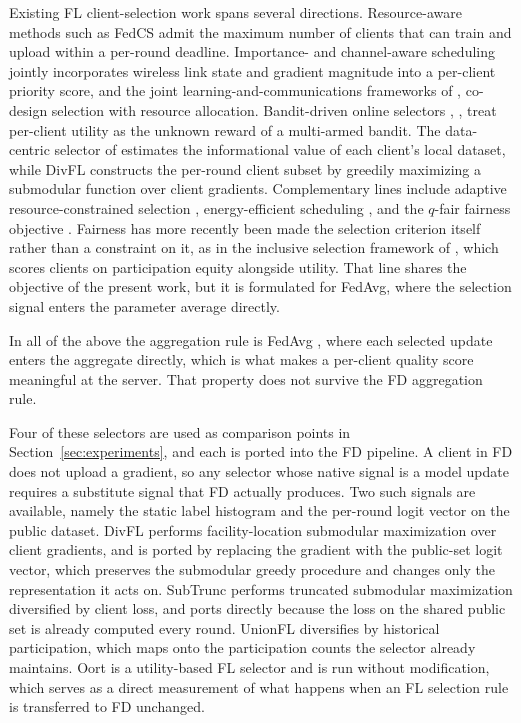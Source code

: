 \documentclass[journal]{IEEEtran}
\newcommand{\rev}[1]{#1}
\begin{document}
Existing FL client-selection work spans several directions. Resource-aware methods such as FedCS \cite{nishio2019client} admit the maximum number of clients that can train and upload within a per-round deadline. Importance- and channel-aware scheduling \cite{yang2020scheduling, ren2020scheduling, shi2020joint} jointly incorporates wireless link state and gradient magnitude into a per-client priority score, and the joint learning-and-communications frameworks of \cite{chen2021joint}, \cite{chen2021convergence} co-design selection with resource allocation. Bandit-driven online selectors \cite{xia2020mab}, \cite{cho2020bandit}, \cite{xu2021online} treat per-client utility as the unknown reward of a multi-armed bandit. The data-centric selector of \cite{saha2023datacentric} estimates the informational value of each client's local dataset, while DivFL \cite{balakrishnan2022divfl} constructs the per-round client subset by greedily maximizing a submodular function over client gradients. Complementary lines include adaptive resource-constrained selection \cite{wang2019adaptive}, energy-efficient scheduling \cite{yang2021energy}, and the $q$-fair fairness objective \cite{li2020qffl}. \rev{Fairness has more recently been made the selection criterion itself rather than a constraint on it, as in the inclusive selection framework of \cite{arisdakessian2026vox}, which scores clients on participation equity alongside utility. That line shares the objective of the present work, but it is formulated for FedAvg, where the selection signal enters the parameter average directly.}

In all of the above the aggregation rule is FedAvg \cite{mcmahan2017communication}, where each selected update enters the aggregate directly, which is what makes a per-client quality score meaningful at the server. That property does not survive the FD aggregation rule.

\rev{Four of these selectors are used as comparison points in Section~\ref{sec:experiments}, and each is ported into the FD pipeline. A client in FD does not upload a gradient, so any selector whose native signal is a model update requires a substitute signal that FD actually produces. Two such signals are available, namely the static label histogram and the per-round logit vector on the public dataset. DivFL \cite{balakrishnan2022divfl} performs facility-location submodular maximization over client gradients, and is ported by replacing the gradient with the public-set logit vector, which preserves the submodular greedy procedure and changes only the representation it acts on. SubTrunc \cite{castillo2024subtrunc} performs truncated submodular maximization diversified by client loss, and ports directly because the loss on the shared public set is already computed every round. UnionFL \cite{castillo2024unionfl} diversifies by historical participation, which maps onto the participation counts the selector already maintains. Oort \cite{lai2021oort} is a utility-based FL selector and is run without modification, which serves as a direct measurement of what happens when an FL selection rule is transferred to FD unchanged.}
\end{document}
